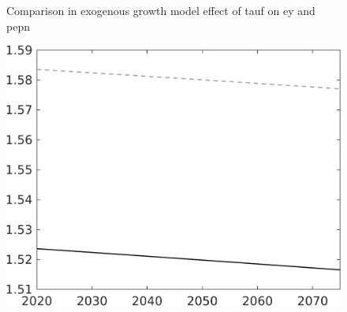 \documentclass[12pt]{article}
\begin{document}
\begin{figure}{Comparison in exogenous growth model effect of tauf on ey and pepn }
\begin{minipage}[]{0.32\textwidth}
		\end{minipage}	
	\begin{minipage}[]{0.32\textwidth}
		\includegraphics[width=1\textwidth]{../../codding_model/own_basedOnFried/optimalPol_010922_revision/figures/all_13Sept22/LevTaufNoTauf_TaulCalib_Equlab_regime0_pn_spillover0_nsk0_xgr1_knspil1_sep0_LFlimit0_emsbase0_countec0_GovRev0_etaa0.79_lgd0.png}
	\end{minipage}


\end{figure}
\end{document}
